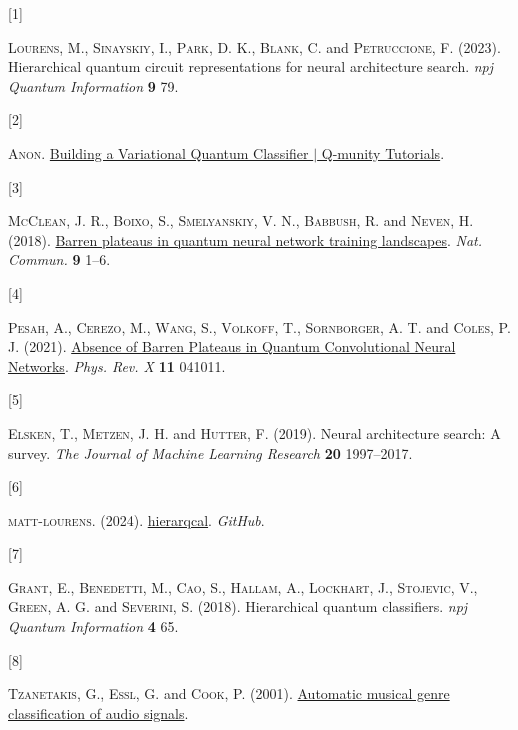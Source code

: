 \documentclass[
  13pt,
  a4paper,
  DIV=11,
  numbers=noendperiod]{scrreprt}
\newlength{\cslhangindent}
\newlength{\csllabelwidth}
\newenvironment{CSLReferences}[2] %
 {\begin{list}{}{%
  \setlength{\itemindent}{0pt}
  \setlength{\leftmargin}{0pt}
  \setlength{\parsep}{0pt}
  \ifodd #1
   \setlength{\leftmargin}{\cslhangindent}
   \setlength{\itemindent}{-1\cslhangindent}
  \fi
  \setlength{\itemsep}{#2\baselineskip}}}
 {\end{list}}
\newcommand{\CSLLeftMargin}[1]{\parbox[t]{\csllabelwidth}{\strut#1\strut}}
\newcommand{\CSLRightInline}[1]{\parbox[t]{\linewidth - \csllabelwidth}{\strut#1\strut}}
\begin{document}
\label{refs}
\begin{CSLReferences}{0}{1}
\CSLLeftMargin{{[}1{]} }%
\CSLRightInline{\textsc{Lourens}, M., \textsc{Sinayskiy}, I.,
\textsc{Park}, D. K., \textsc{Blank}, C. and \textsc{Petruccione}, F.
(2023). Hierarchical quantum circuit representations for neural
architecture search. \emph{npj Quantum Information} \textbf{9} 79.}

\CSLLeftMargin{{[}2{]} }%
\CSLRightInline{\textsc{Anon}.
\href{https://www.qmunity.tech/tutorials/building-a-variational-quantum-classifier}{{Building
a Variational Quantum Classifier {\(\vert\)} Q-munity Tutorials}}.}

\CSLLeftMargin{{[}3{]} }%
\CSLRightInline{\textsc{McClean}, J. R., \textsc{Boixo}, S.,
\textsc{Smelyanskiy}, V. N., \textsc{Babbush}, R. and \textsc{Neven}, H.
(2018). \href{https://doi.org/10.1038/s41467-018-07090-4}{{Barren
plateaus in quantum neural network training landscapes}}. \emph{Nat.
Commun.} \textbf{9} 1--6.}

\CSLLeftMargin{{[}4{]} }%
\CSLRightInline{\textsc{Pesah}, A., \textsc{Cerezo}, M., \textsc{Wang},
S., \textsc{Volkoff}, T., \textsc{Sornborger}, A. T. and \textsc{Coles},
P. J. (2021). \href{https://doi.org/10.1103/PhysRevX.11.041011}{{Absence
of Barren Plateaus in Quantum Convolutional Neural Networks}}.
\emph{Phys. Rev. X} \textbf{11} 041011.}

\CSLLeftMargin{{[}5{]} }%
\CSLRightInline{\textsc{Elsken}, T., \textsc{Metzen}, J. H. and
\textsc{Hutter}, F. (2019). Neural architecture search: A survey.
\emph{The Journal of Machine Learning Research} \textbf{20} 1997--2017.}

\CSLLeftMargin{{[}6{]} }%
\CSLRightInline{\textsc{matt-lourens}. (2024).
\href{https://github.com/matt-lourens/hierarqcal?tab=readme-ov-file}{{hierarqcal}}.
\emph{GitHub}.}

\CSLLeftMargin{{[}7{]} }%
\CSLRightInline{\textsc{Grant}, E., \textsc{Benedetti}, M.,
\textsc{Cao}, S., \textsc{Hallam}, A., \textsc{Lockhart}, J.,
\textsc{Stojevic}, V., \textsc{Green}, A. G. and \textsc{Severini}, S.
(2018). Hierarchical quantum classifiers. \emph{npj Quantum Information}
\textbf{4} 65.}

\CSLLeftMargin{{[}8{]} }%
\CSLRightInline{\textsc{Tzanetakis}, G., \textsc{Essl}, G. and
\textsc{Cook}, P. (2001).
\href{http://ismir2001.ismir.net/pdf/tzanetakis.pdf}{Automatic musical
genre classification of audio signals}.}


\end{CSLReferences}
\end{document}
